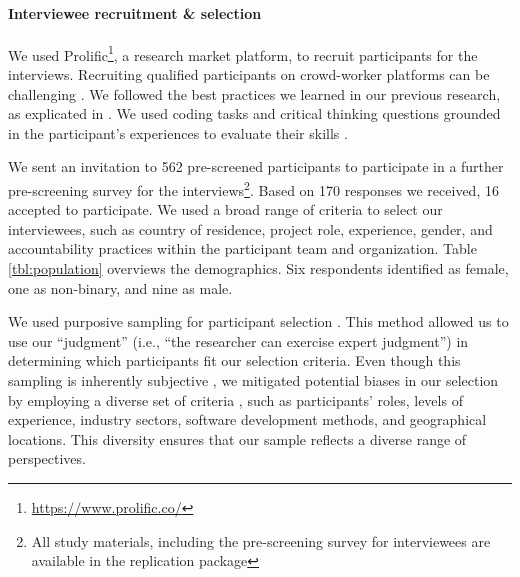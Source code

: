 \begin{table*}[t!]
\begin{center}
\begin{tabular}{l|p{2.5cm}|c|c|p{4cm}|c|p{1.1cm}}
     \bottomrule
     
    \end{tabular}
   
  \end{center}
  
\end{table*}

\paragraph*{Interviewee recruitment \& selection}\label{Interviewee_recruitment} We used Prolific\footnote{\url{https://www.prolific.co/}}, a research market platform, to recruit participants for the interviews. Recruiting qualified participants on crowd-worker platforms can be challenging \cite{alami2024you}. We followed the best practices we learned in our previous research, as explicated in \citep{alami2024understanding}. We used coding tasks and critical thinking questions grounded in the participant's experiences to evaluate their skills \citep{alami2024you}.

We sent an invitation to 562 pre-screened participants to participate in a further pre-screening survey for the interviews\footnote{All study materials, including the pre-screening survey for interviewees are available in the replication package}. Based on 170 responses we received, 16 accepted to participate. We used a broad range of criteria to select our interviewees, such as country of residence, project role, experience, gender, and accountability practices within the participant team and organization. Table \ref{tbl:population} overviews the demographics. Six respondents identified as female, one as non-binary, and nine as male.


We used purposive sampling for participant selection \citep{baltes2022sampling}. This method allowed us to use our ``judgment'' (i.e., ``the researcher can exercise expert judgment'') \citep{baltes2022sampling} in determining which participants fit our selection criteria. Even though this sampling is inherently subjective \citep{baltes2022sampling}, we mitigated potential biases in our selection by employing a diverse set of criteria \citep{baltes2022sampling}, such as participants' roles, levels of experience, industry sectors, software development methods, and geographical locations. This diversity ensures that our sample reflects a diverse range of perspectives.

